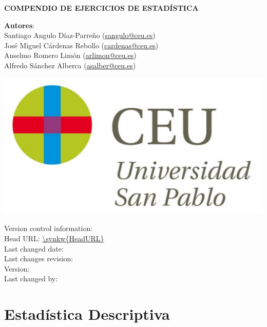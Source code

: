 \documentclass[a4paper,titlepage]{article}
\begin{document}
\sloppy

\begin{titlepage}
\vspace*{5cm}
\begin{center}
{\huge \bf COMPENDIO DE EJERCICIOS DE ESTADÍSTICA\par}
\vspace{0.5cm}
{\large \noindent \textbf{Autores}: \\
Santiago Angulo Díaz-Parreño (\url{sangulo@ceu.es})\\
José Miguel Cárdenas Rebollo (\url{cardenas@ceu.es})\\
Anselmo Romero Limón (\url{arlimon@ceu.es})\\
Alfredo Sánchez Alberca (\url{asalber@ceu.es})
}

\vspace{1cm}
 \includegraphics[scale=0.3]{img/logo_uspceu_01}
\end{center}
 \vfill
 \flushleft\sffamily
 Version control information:\\
 Head URL: \url{\svnkw{HeadURL}}\\
 Last changed date: \svndate\\
 Last changes revision: \svnrev\\
 Version: \svnFullRevision*{\svnrev}\\
 Last changed by: \svnFullAuthor*{\svnauthor}\\
\end{titlepage}

\setcounter{tocdepth}{2}
\tableofcontents
\newpage

\section{Estadística Descriptiva}
\begin{enumerate}[leftmargin=*]
\end{enumerate}
\end{document}
